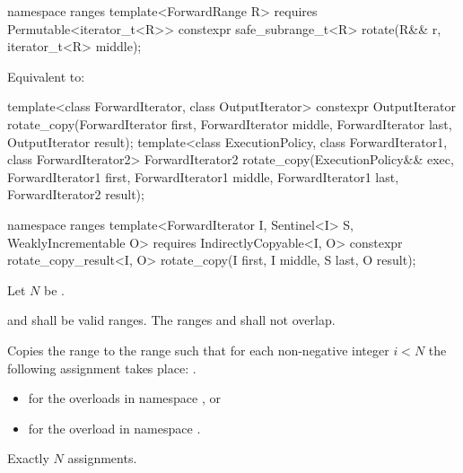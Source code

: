 \begin{itemdecl}
namespace ranges {
  template<ForwardRange R>
    requires Permutable<iterator_t<R>>
    constexpr safe_subrange_t<R> rotate(R&& r, iterator_t<R> middle);
}
\end{itemdecl}

\begin{itemdescr}
\pnum
\effects
Equivalent to:
\end{itemdescr}

%
\begin{itemdecl}
template<class ForwardIterator, class OutputIterator>
  constexpr OutputIterator
    rotate_copy(ForwardIterator first, ForwardIterator middle, ForwardIterator last,
                OutputIterator result);
template<class ExecutionPolicy, class ForwardIterator1, class ForwardIterator2>
  ForwardIterator2
    rotate_copy(ExecutionPolicy&& exec,
                ForwardIterator1 first, ForwardIterator1 middle, ForwardIterator1 last,
                ForwardIterator2 result);

namespace ranges {
  template<ForwardIterator I, Sentinel<I> S, WeaklyIncrementable O>
    requires IndirectlyCopyable<I, O>
    constexpr rotate_copy_result<I, O>
      rotate_copy(I first, I middle, S last, O result);
}
\end{itemdecl}

\begin{itemdescr}
\pnum
Let $N$ be .

\pnum
\requires
{} and  shall be valid ranges.
The ranges  and 
shall not overlap.

\pnum
\effects
Copies the range  to the range 
such that for each non-negative integer $i < N$
the following assignment takes place:
.

\pnum
\returns
\begin{itemize}
\item
   for the overloads in namespace , or
\item
   for the overload in namespace .
\end{itemize}

\pnum
\complexity
Exactly $N$ assignments.
\end{itemdescr}

